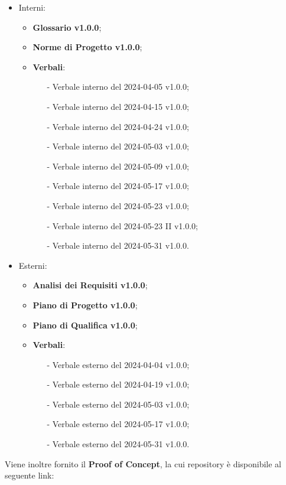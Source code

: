 \documentclass[8pt]{article}
\begin{document}
\begin{itemize}
    \item Interni:
\begin{itemize}
    \item \textbf{Glossario v1.0.0};
    \item \textbf{Norme di Progetto v1.0.0};
    \item \textbf{Verbali}:
    \begin{itemize}
			\item[-] Verbale interno del 2024-04-05 v1.0.0;
			\item[-] Verbale interno del 2024-04-15 v1.0.0;
			\item[-] Verbale interno del 2024-04-24 v1.0.0;	
			\item[-] Verbale interno del 2024-05-03 v1.0.0;
			\item[-] Verbale interno del 2024-05-09 v1.0.0;
			\item[-] Verbale interno del 2024-05-17 v1.0.0;
			\item[-] Verbale interno del 2024-05-23 v1.0.0;
      \item[-] Verbale interno del 2024-05-23 II v1.0.0; 
			\item[-] Verbale interno del 2024-05-31 v1.0.0.
    \end{itemize}
\end{itemize}
    \item Esterni:
\begin{itemize}
    \item \textbf{Analisi dei Requisiti v1.0.0};
    \item \textbf{Piano di Progetto v1.0.0};
    \item \textbf{Piano di Qualifica v1.0.0};
    \item \textbf{Verbali}:
    \begin{itemize}
			\item[-] Verbale esterno del 2024-04-04 v1.0.0;
			\item[-] Verbale esterno del 2024-04-19 v1.0.0;
			\item[-] Verbale esterno del 2024-05-03 v1.0.0;
			\item[-] Verbale esterno del 2024-05-17 v1.0.0;
			\item[-] Verbale esterno del 2024-05-31 v1.0.0.
    \end{itemize}
\end{itemize}
\end{itemize}
\vspace{1em}
Viene inoltre fornito il \textbf{Proof of Concept}, la cui repository è disponibile al seguente link:
\end{document}
